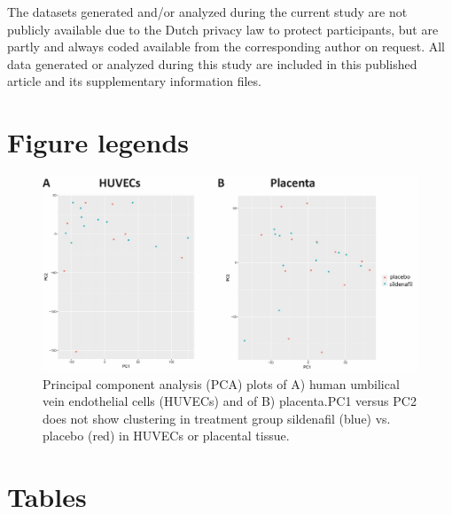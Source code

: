 \documentclass[authordate, empirical]{jote-new-article}
\begin{document}
The datasets generated and/or analyzed during the current study are not publicly available due to the Dutch privacy law to protect participants, but are partly and always coded available from the corresponding author on request. All data generated or analyzed during this study are included in this published article and its supplementary information files.



\printbibliography







\clearpage
\onecolumn
\section{Figure legends}











\begin{figure}[h!]
  \includegraphics[width=\linewidth]{media/image1.jpeg}

  \caption{Principal component analysis (PCA) plots of A) human umbilical vein endothelial cells (HUVECs) and of B) placenta.PC1 versus PC2 does not show clustering in treatment group sildenafil (blue) vs. placebo (red) in HUVECs or placental tissue.}

  \label{fig:rId8}


\end{figure}





\newpage

\section{Tables}
\end{document}
